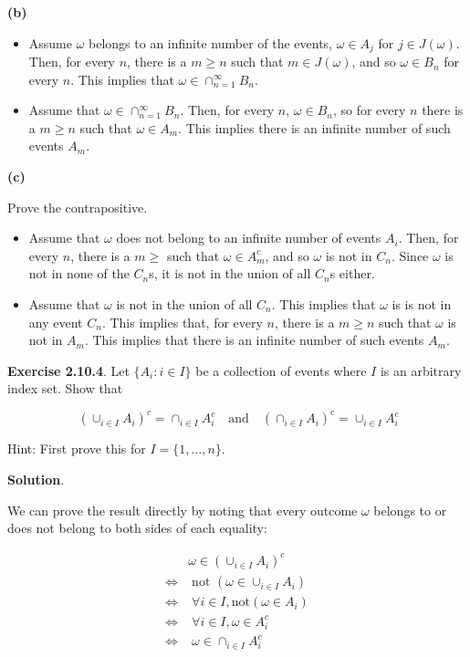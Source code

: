\textbf{(b)}

\begin{itemize}
\item
  Assume \(\omega\) belongs to an infinite number of the events,
  \(\omega \in A_{j}\) for \(j \in J(\omega)\). Then, for every \(n\),
  there is a \(m \geq n\) such that \(m \in J(\omega)\), and so
  \(\omega \in B_{n}\) for every \(n\). This implies that
  \(\omega \in \cap_{n = 1}^{\infty} B_{n}\).
\item
  Assume that \(\omega \in \cap_{n = 1}^{\infty} B_{n}\). Then, for every
  \(n\), \(\omega \in B_{n}\), so for every \(n\) there is a \(m \geq n\)
  such that \(\omega \in A_m\). This implies there is an infinite number
  of such events \(A_m\).
\end{itemize}

\textbf{(c)}

Prove the contrapositive.

\begin{itemize}[tightlist]
\item
  Assume that \(\omega\) does not belong to an infinite number of events
  \(A_{i}\). Then, for every \(n\), there is a \(m \geq\) such that
  \(\omega \in A_m^{c}\), and so \(\omega\) is not in \(C_{n}\). Since
  \(\omega\) is not in none of the \(C_{n}\)s, it is not in the union of
  all \(C_{n}\)s either.
\item
  Assume that \(\omega\) is not in the union of all \(C_{n}\). This
  implies that \(\omega\) is is not in any event \(C_{n}\). This implies
  that, for every \(n\), there is a \(m \geq n\) such that \(\omega\) is
  not in \(A_m\). This implies that there is an infinite number of such
  events \(A_m\).
\end{itemize}

\textbf{Exercise 2.10.4}. Let \(\{ A_{i} : i \in I \}\) be a collection of
events where \(I\) is an arbitrary index set. Show that

\[ \
\left( \cup_{i \in I} A_{i} \right)^{c} = \cap_{i \in I} A_{i}^{c} 
\quad \text{and} \quad
\left( \cap_{i \in I} A_{i} \right)^{c} = \cup_{i \in I} A_{i}^{c} 
\]

Hint: First prove this for \(I = \{1, \dots, n\}\).

\textbf{Solution}.

We can prove the result directly by noting that every outcome \(\omega\) belongs to or does not belong to both sides of each equality:

\begin{align*}
& \omega \in \left( \cup_{i \in I} A_{i} \right)^{c} 
\\
\Longleftrightarrow
& \; \text{not }\left( \omega \in \cup_{i \in I} A_{i}  \right) 
\\
\Longleftrightarrow
& \; \forall i \in I, \text{not} \left( \omega \in A_{i} \right) 
\\
\Longleftrightarrow
& \; \forall i \in I, \omega \in A_{i}^{c} 
\\
\Longleftrightarrow
& \; \omega \in \cap_{i \in I} A_{i}^{c}
\end{align*}

